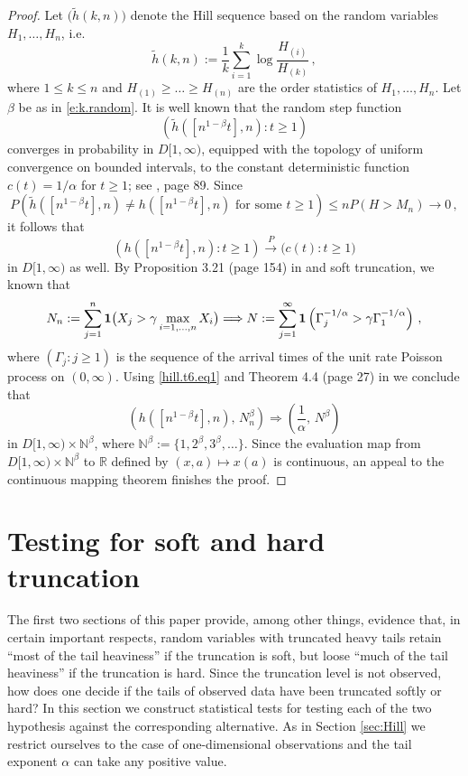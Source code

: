 \documentclass[11pt]{amsart}
\numberwithin{equation}{section}
\begin{document}
\begin{proof} Let $\bigl(\tilde h(k,n)\bigr)$ denote the Hill sequence
based on the random variables   $H_1,\ldots,H_n$, i.e. 
$$
\tilde h(k,n):=\frac1k\sum_{i=1}^k\log\frac{H_{(i)}}{H_{(k)}}\,,
$$
where $1\le k\le n$ and $H_{(1)}\ge\ldots\ge H_{(n)}$ are the order
statistics of $H_1,\ldots,H_n$. Let $\beta$ be as in
\eqref{e:k.random}. It is well known that the random step function 
$$
\left(\tilde h([n^{1-\beta}t],n):t\ge1\right)
$$ 
converges in probability in $D[1,\infty)$, equipped with the topology
  of uniform   convergence on bounded intervals, to the constant 
deterministic function $c(t) = 1/\alpha$ for $t\geq 1$; see
\cite{resnick:2007}, page 89. Since 
$$
P\left(\tilde h([n^{1-\beta}t],n)\neq h([n^{1-\beta}t],n)\mbox{ for
  some }t\ge1\right)\le nP(H>M_n)\longrightarrow0\,, 
$$
it follows that 
\begin{equation}\label{hill.t6.eq1}
\left(h([n^{1-\beta}t],n):t\ge1\right){\stackrel{P}{\longrightarrow}} \bigl( c(t): t\geq 1\bigr) 
\end{equation}
in $D[1,\infty)$ as well. 
By Proposition 3.21 (page 154) in \cite{resnick:1987} and soft
truncation, we known that 
$$
N_n:=\sum_{j=1}^n {{\bf 1}}\bigl(
  X_j>\gamma\max_{i=1,\ldots, n} X_i\bigr)\Longrightarrow
  N:=\sum_{j=1}^\infty{{\bf 1}}\left(\Gamma_j^{-1/\alpha}>\gamma
\Gamma_1^{-1/\alpha}\right)\,, 
$$
where $\left(\Gamma_j:j\ge1\right)$ is the sequence of the arrival
times of the unit rate Poisson process on $(0,\infty)$. Using 
\eqref{hill.t6.eq1} and Theorem 4.4 (page 27) in
\cite{billingsley:1968} we conclude that 
$$
\left(h([n^{1-\beta}t],n),\, N_n^\beta\right)\Longrightarrow
\left(\frac1\alpha,\, N^\beta\right) 
$$
in $D[1,\infty)\times{\mathbb N}^\beta$, where
$
{\mathbb N}^\beta:=\{1,2^\beta,3^\beta,\ldots\}
$.
Since the evaluation map from $D[1,\infty)\times{\mathbb N}^\beta$ to
  ${{\mathbb R}}$ defined by $(x,a)\mapsto x(a)$ 
is continuous, an appeal to the continuous mapping theorem finishes 
the proof. 
\end{proof}

\section{Testing for soft and hard truncation} \label{sec:regime.test}

The first two sections of this paper provide, among other things,
evidence that, in certain important respects, random variables with
truncated heavy tails retain ``most of the tail heaviness'' if the
truncation is soft, but loose ``much of the tail heaviness'' if the
truncation is hard. Since the truncation level is not observed, how
does one decide if the tails of observed data have been truncated softly
or hard? In this section we construct statistical tests for testing
each of the two hypothesis against the corresponding alternative. 
As in Section \ref{sec:Hill} we restrict ourselves to the case of
one-dimensional observations and the tail
exponent $\alpha$ can take any positive value.
\end{document}
